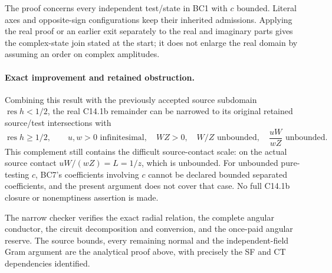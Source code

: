 The proof concerns every independent test/state in BC1 with $c$
bounded. Literal axes and opposite-sign configurations keep their
inherited admissions. Applying the real proof or an earlier exit
separately to the real and imaginary parts gives the complex-state
join stated at the start; it does not enlarge the real domain by
assuming an order on complex amplitudes.

\paragraph{Exact improvement and retained obstruction.}
Combining this result with the previously accepted source subdomain
$\operatorname{res}h<1/2$, the real C14.1b remainder can be narrowed
to its original retained source/test intersections with
\[
 \operatorname{res}h\ge1/2,\qquad
 u,w>0\text{ infinitesimal},\quad WZ>0,\quad W/Z\text{ unbounded},
 \quad \frac{uW}{wZ}\text{ unbounded}.
 \tag{BC11}
\]
This complement still contains the difficult source-contact scale:
on the actual source contact $uW/(wZ)=L=1/z$, which is unbounded.
For unbounded pure-testing $c$, BC7's coefficients involving $c$
cannot be declared bounded separated coefficients, and the present
argument does not cover that case. No full C14.1b closure or
nonemptiness assertion is made.

The narrow checker verifies the exact radial relation, the complete
angular conductor, the circuit decomposition and conversion, and
the once-paid angular reserve. The source bounds, every remaining
normal and the independent-field Gram argument are the analytical
proof above, with precisely the SF and CT dependencies identified.
